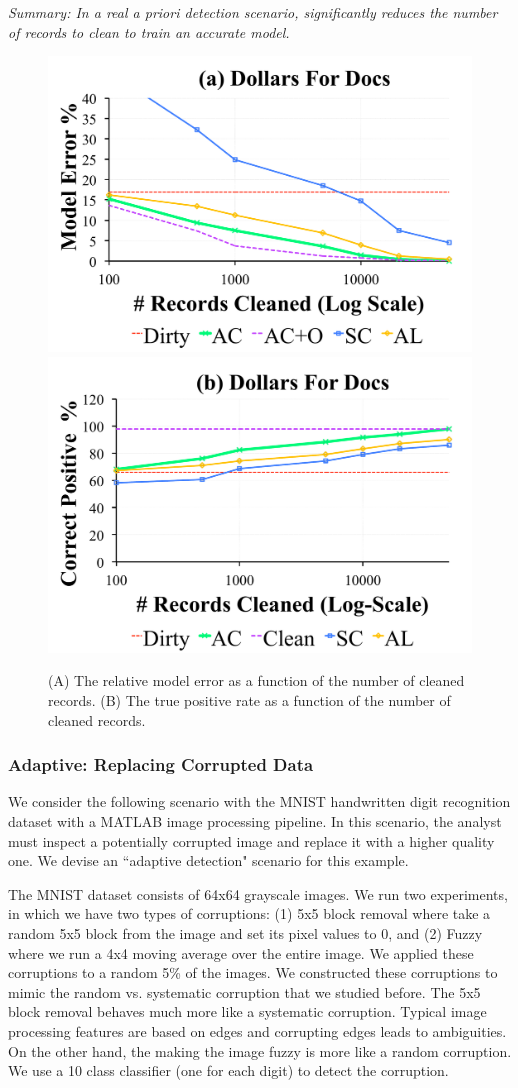 \vspace{0.25em}

\noindent \emph{Summary: In a real a priori detection scenario, \sys significantly reduces the number of records to clean to train an accurate model. }

\begin{figure}[ht!]
\centering
 \includegraphics[width=0.49\columnwidth]{exp/exp13a.pdf}
 \includegraphics[width=0.49\columnwidth]{exp/exp13b.pdf}\vspace{-1em}
 \caption{(A) The relative model error as a function of the number of cleaned records. (B) The true positive rate as a function of the number of cleaned records. \label{dfd}}\vspace{-1em}
\end{figure}

\subsubsection{Adaptive: Replacing Corrupted Data}
We consider the following scenario with the MNIST handwritten digit recognition dataset with a MATLAB image processing pipeline.
In this scenario, the analyst must inspect a potentially corrupted image and replace it with a higher quality one.
We devise an ``adaptive detection" \sys scenario for this example.

The MNIST dataset consists of 64x64 grayscale images.
We run two experiments, in which we have two types of corruptions: (1) 5x5 block removal where take a random 5x5 block from the image and set its pixel values to 0, and (2) Fuzzy where we run a 4x4 moving average over the entire image.
We applied these corruptions to a random 5\% of the images.
We constructed these corruptions to mimic the random vs. systematic corruption that we studied before.
The 5x5 block removal behaves much more like a systematic corruption. 
Typical image processing features are based on edges and corrupting edges leads to ambiguities.
On the other hand, the making the image fuzzy is more like a random corruption.
We use a 10 class classifier (one for each digit) to detect the corruption.

